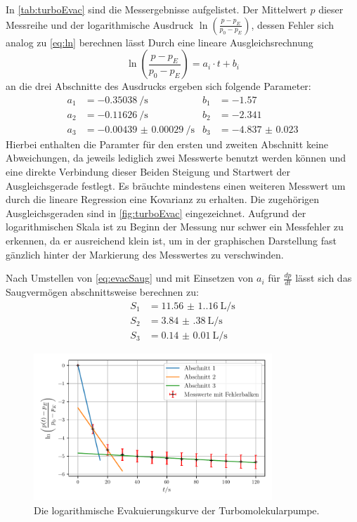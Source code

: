     In \autoref{tab:turboEvac} sind die Messergebnisse aufgelistet. Der Mittelwert $p$ dieser Messreihe und der logarithmische Ausdruck
    $\ln\left(\frac{p-p_E}{p_0-p_E}\right)$, dessen Fehler sich analog zu \autoref{eq:ln} berechnen lässt
    Durch eine lineare Ausgleichsrechnung 
    \begin{equation*}
        \ln\left(\frac{p-p_E}{p_0-p_E}\right) = a_i \cdot t + b_i
    \end{equation*}
    an die drei Abschnitte des Ausdrucks ergeben sich folgende Parameter:
    \begin{align*}
        a_1 &= \qty{-0.35038}{\per\second} & b_1 &= \num{-1.57} \\
        a_2 &= \qty{-0.11626}{\per\second} & b_2 &= \num{-2.341} \\
        a_3 &= \qty{-0.00439(29)}{\per\second} & b_3 &= \num{-4.837(23)}
    \end{align*}
    Hierbei enthalten die Paramter für den ersten und zweiten Abschnitt keine Abweichungen, da jeweils lediglich zwei Messwerte benutzt werden können und eine direkte
    Verbindung dieser Beiden Steigung und Startwert der Ausgleichsgerade festlegt. Es bräuchte mindestens einen weiteren Messwert um durch die lineare Regression eine Kovarianz zu erhalten.
    Die zugehörigen Ausgleichsgeraden sind in \autoref{fig:turboEvac} eingezeichnet. Aufgrund der logarithmischen Skala ist zu Beginn der Messung nur schwer ein Messfehler zu erkennen,
    da er ausreichend klein ist, um in der graphischen Darstellung fast gänzlich hinter der Markierung des Messwertes zu verschwinden.

    Nach Umstellen von \autoref{eq:evacSaug} und mit Einsetzen von $a_i$ für $\frac{dp}{dt}$
    lässt sich das Saugvermögen abschnittsweise berechnen zu:
    \begin{align*}
        S_1 &= \qty{11.56(1.16)}{\liter\per\second} \\
        S_2 &= \qty{3.84(38)}{\liter\per\second} \\
        S_3 &= \qty{0.14(1)}{\liter\per\second} 
    \end{align*}

    \begin{figure}
        \centering
        \includegraphics[width=0.8\textwidth]{abb/turbo_evac.pdf}
        \caption{Die logarithmische Evakuierungskurve der Turbomolekularpumpe.}
        \label{fig:turboEvac}
    \end{figure}

